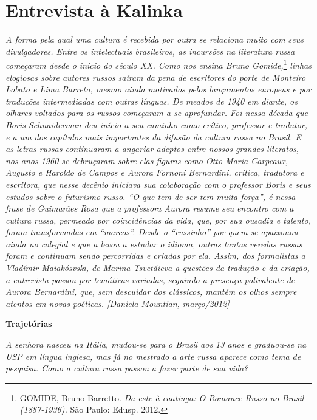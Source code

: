 \chapter{Entrevista à Kalinka}

\emph{A forma pela qual uma cultura é recebida por outra se relaciona
muito com seus divulgadores. Entre os intelectuais brasileiros, as
incursões na literatura russa começaram desde o início do século XX.
Como nos ensina Bruno Gomide,}\footnote{GOMIDE, Bruno Barretto. \emph{Da
  este à caatinga: O Romance Russo no Brasil (1887-1936).} São Paulo:
  Edusp. 2012.} \emph{linhas elogiosas sobre autores russos saíram da
pena de escritores do porte de Monteiro Lobato e Lima Barreto, mesmo
ainda motivados pelos lançamentos europeus e por traduções intermediadas
com outras línguas. De meados de 1940 em diante, os olhares voltados
para os russos começaram a se aprofundar. Foi nessa década que Boris
Schnaiderman deu início a seu caminho como crítico, professor e
tradutor, e a um dos capítulos mais importantes da difusão da cultura
russa no Brasil. E as letras russas continuaram a angariar adeptos entre
nossos grandes literatos, nos anos 1960 se debruçaram sobre elas figuras
como Otto Maria Carpeaux, Augusto e Haroldo de Campos e Aurora Fornoni
Bernardini, crítica, tradutora e escritora, que nesse decênio iniciava
sua colaboração com o professor Boris e seus estudos sobre o futurismo
russo. ``O que tem de ser tem muita força'', é nessa frase de Guimarães
Rosa que a professora Aurora resume seu encontro com a cultura russa,
permeado por coincidências da vida, que, por sua ousadia e talento,
foram transformadas em ``marcos''. Desde o ``russinho'' por quem se
apaixonou ainda no colegial e que a levou a estudar o idioma, outras
tantas veredas russas foram e continuam sendo percorridas e criadas por
ela. Assim, dos formalistas a Vladímir Maiakósvski, de Marina Tsvetáieva
a questões da tradução e da criação, a entrevista passou por temáticas
variadas, seguindo a presença polivalente de Aurora Bernardini, que, sem
descuidar dos clássicos, mantém os olhos sempre atentos em novas
poéticas. {[}Daniela Mountian, março/2012{]}}

\textbf{Trajetórias}

\emph{A senhora nasceu na Itália, mudou-se para o Brasil aos 13 anos e
graduou-se na USP em língua inglesa, mas já no mestrado a arte russa
aparece como tema de pesquisa. Como a cultura russa passou a fazer parte
de sua vida?}

